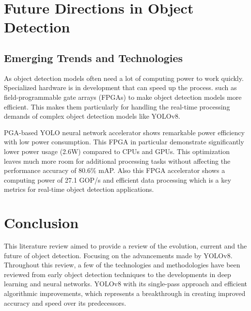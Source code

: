 \documentclass[11pt,journal,compsoc]{IEEEtran}
\begin{document}
\section{Future Directions in Object Detection}
\subsection{Emerging Trends and Technologies}
As object detection models often need a lot of computing power to work quickly. Specialized hardware is in development that can speed up the process. such as field-programmable gate arrays (FPGAs)\cite{zeng2022fpga} to make object detection models more efficient. This makes them particularly for handling the real-time processing demands of complex object detection models like YOLOv8.

\begin{table}[ht]
\centering
\caption{Performance Comparison of Different Hardware Platforms \cite{li2022fpga}}
\label{table:hardware_comparison}
\end{table}

PGA-based YOLO neural network accelerator\cite{li2022fpga} shows remarkable power efficiency with low power consumption. This FPGA in particular demonstrate significantly lower power usage (2.6W) compared to CPUs and GPUs. This optimization leaves much more room for additional processing tasks without affecting the performance accuracy of 80.6\% mAP. Also this FPGA accelerator shows a computing power of 27.1 GOP/s and efficient data processing which is a key metrics for real-time object detection applications.

\section{Conclusion}
This literature review aimed to provide a review of the evolution, current and the future of object detection. Focusing on the advancements made by YOLOv8. Throughout this review, a few of the technologies and methodologies have been reviewed from early object detection techniques to the developments in deep learning and neural networks. YOLOv8 with its single-pass approach and efficient algorithmic improvements, which represents a breakthrough in creating improved accuracy and speed over its predecessors.
\end{document}
